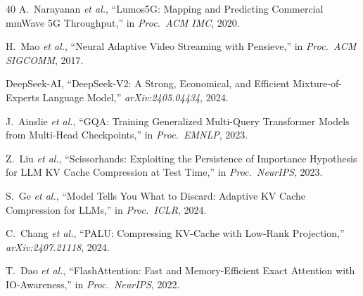 \documentclass[journal]{IEEEtran}
\newcommand{\etal}{\textit{et al.}\xspace}
\begin{document}
\begin{thebibliography}{40}
A.~Narayanan \etal, ``Lumos5G: Mapping and Predicting Commercial mmWave 5G Throughput,'' in \emph{Proc.\ ACM IMC}, 2020.

H.~Mao \etal, ``Neural Adaptive Video Streaming with Pensieve,'' in \emph{Proc.\ ACM SIGCOMM}, 2017.

DeepSeek-AI, ``DeepSeek-V2: A Strong, Economical, and Efficient Mixture-of-Experts Language Model,'' \emph{arXiv:2405.04434}, 2024.

J.~Ainslie \etal, ``GQA: Training Generalized Multi-Query Transformer Models from Multi-Head Checkpoints,'' in \emph{Proc.\ EMNLP}, 2023.

Z.~Liu \etal, ``Scissorhands: Exploiting the Persistence of Importance Hypothesis for LLM KV Cache Compression at Test Time,'' in \emph{Proc.\ NeurIPS}, 2023.

S.~Ge \etal, ``Model Tells You What to Discard: Adaptive KV Cache Compression for LLMs,'' in \emph{Proc.\ ICLR}, 2024.

C.~Chang \etal, ``PALU: Compressing KV-Cache with Low-Rank Projection,'' \emph{arXiv:2407.21118}, 2024.

T.~Dao \etal, ``FlashAttention: Fast and Memory-Efficient Exact Attention with IO-Awareness,'' in \emph{Proc.\ NeurIPS}, 2022.

\end{thebibliography}
\end{document}
